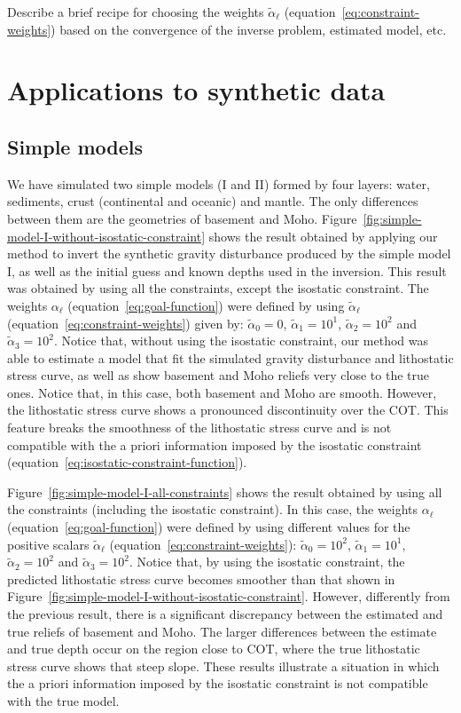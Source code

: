 \documentclass[manuscript]{geophysics}
\begin{document}
Describe a brief recipe for choosing the weights $\tilde{\alpha}_{\ell}$ 
(equation~\ref{eq:constraint-weights}) based on the convergence of the
inverse problem, estimated model, etc.



\section{Applications to synthetic data}


\subsection{Simple models}

We have simulated two simple models (I and II) formed by four layers: water, sediments,
crust (continental and oceanic) and mantle.
The only differences between them are the geometries of basement and Moho.
Figure~\ref{fig:simple-model-I-without-isostatic-constraint} 
shows the result obtained by applying 
our method to invert the synthetic gravity disturbance produced by the simple model I,
as well as the initial guess and known depths used in the inversion.
This result was obtained by using all the constraints, except the isostatic
constraint.
The weights $\alpha_{\ell}$ (equation~\ref{eq:goal-function}) were defined
by using $\tilde{\alpha}_{\ell}$ (equation~\ref{eq:constraint-weights}) given by: 
$\tilde{\alpha}_{0} = 0$, $\tilde{\alpha}_{1} = 10^{1}$, 
$\tilde{\alpha}_{2} = 10^{2}$ and $\tilde{\alpha}_{3} = 10^{2}$.
Notice that, without using the isostatic constraint, our method was able
to estimate a model that fit the simulated gravity disturbance and 
lithostatic stress curve, as well as show basement and Moho reliefs 
very close to the true ones.
Notice that, in this case, both basement and Moho are smooth. However,
the lithostatic stress curve shows a pronounced discontinuity over the COT. 
This feature breaks the smoothness of the lithostatic stress curve and 
is not compatible with the a priori information imposed by
the isostatic constraint (equation~\ref{eq:isostatic-constraint-function}).

Figure~\ref{fig:simple-model-I-all-constraints} shows the result
obtained by using all the constraints (including the isostatic constraint).
In this case, the weights $\alpha_{\ell}$ (equation~\ref{eq:goal-function}) 
were defined by using different values for the positive scalars 
$\tilde{\alpha}_{\ell}$ (equation~\ref{eq:constraint-weights}): 
$\tilde{\alpha}_{0} = 10^{2}$, $\tilde{\alpha}_{1} = 10^{1}$, 
$\tilde{\alpha}_{2} = 10^{2}$ and $\tilde{\alpha}_{3} = 10^{2}$.
Notice that, by using the isostatic constraint, the predicted 
lithostatic stress curve becomes smoother than that shown in 
Figure~\ref{fig:simple-model-I-without-isostatic-constraint}. 
However, differently from the previous result, there is a significant 
discrepancy between the estimated and true reliefs of basement and Moho.
The larger differences between the estimate and true depth occur
on the region close to COT, where the true lithostatic stress curve
shows that steep slope.
These results illustrate a situation in which the a priori information
imposed by the isostatic constraint is not compatible with the 
true model.
\end{document}
